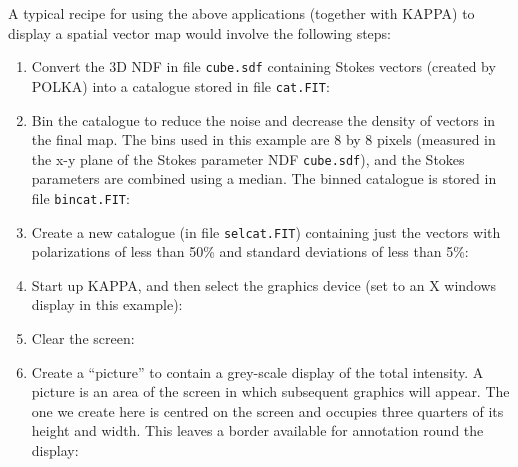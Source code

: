 \documentclass[twoside,11pt]{starlink}
\begin{document}
A typical recipe for using the above applications (together with KAPPA)
to display a spatial vector map would involve the following steps:

\begin{enumerate}

\item Convert the 3D NDF in file \verb+cube.sdf+ containing Stokes vectors
(created by POLKA) into a catalogue stored in file \verb+cat.FIT+:

\begin{terminalv}
\end{terminalv}

\item Bin the catalogue to reduce the noise and decrease the density
of vectors in the final map. The bins used in this example are 8 by
8 pixels (measured in
the x-y plane of the Stokes parameter NDF \verb+cube.sdf+), and the
Stokes parameters are combined using a median. The binned catalogue is
stored in file \verb+bincat.FIT+:

\begin{terminalv}
\end{terminalv}

\item Create a new catalogue (in file \verb+selcat.FIT+) containing just
the vectors with polarizations of less than 50\% and standard deviations of
less than 5\%:

\begin{terminalv}
\end{terminalv}

\item \label{STEP:DEVICE} Start up KAPPA, and then select the graphics
device (set to an X windows display in this example):
\begin{terminalv}
\end{terminalv}

\item Clear the screen:
\begin{terminalv}
\end{terminalv}

\item \label{STEP:PICDEF} Create a ``picture'' to contain a grey-scale display of the total
intensity. A picture is an area of the screen in which subsequent graphics
will appear. The one we create here is centred on the screen and occupies
three quarters of its height and width. This leaves a border available
for annotation round the display:
\begin{terminalv}
\end{terminalv}


\end{enumerate}
\end{document}
